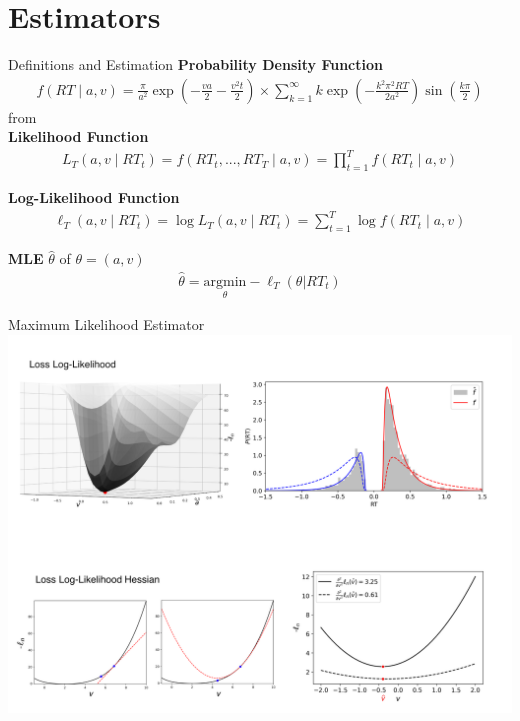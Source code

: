 \documentclass[8pt]{beamer}
\begin{document}
\section{Estimators}

\begin{frame}{Definitions and Estimation}
\textbf{Probability Density Function}
\begin{align}
    f(RT \mid a, v) = \frac{\pi}{a^2}\exp\left(-\frac{va}{2}-\frac{v^2t}{2}\right) \times\sum_{k=1}^\infty k\exp\left(-\frac{k^2\pi^2 RT}{2a^2}\right)\sin(\frac{k\pi}{2})
\end{align}
from \citet{feller_introduction_1968, navarro_fast_2009}\\

\vspace{.25cm}
\textbf{Likelihood Function}
\begin{align}
    L_T(a, v \mid RT_t) = f(RT_t, ..., RT_T \mid a, v) = \prod_{t=1}^T f(RT_t \mid a, v)
\end{align}

\vspace{.25cm}
\textbf{Log-Likelihood Function}
\begin{align}
    \ell_T (a, v \mid RT_t) = \log L_T(a, v \mid RT_t) = \sum_{t=1}^T \log f(RT_t \mid a, v)
\end{align}

\vspace{.25cm}
\textbf{MLE} $\hat\theta$ of $\theta = (a, v)$
\begin{align}
    \hat\theta = \underset{\theta}{\text{argmin}} -\ell_T (\theta | RT_t)
\end{align}

\end{frame}


\begin{frame}{Maximum Likelihood Estimator}
    \includegraphics[width=1\textwidth]{docs/slides/figures/mle.png}
\end{frame}
\end{document}

